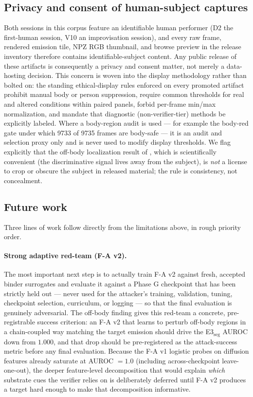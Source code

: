 \subsection{Privacy and consent of human-subject captures}\label{sec:discussion:privacy}

Both sessions in this corpus feature an identifiable human performer (D2 the first-human session, V10 an improvisation session), and every raw frame, rendered emission tile, NPZ RGB thumbnail, and browse preview in the release inventory therefore contains identifiable-subject content. Any public release of these artifacts is consequently a privacy and consent matter, not merely a data-hosting decision. This concern is woven into the display methodology rather than bolted on: the standing ethical-display rules enforced on every promoted artifact prohibit manual body or person suppression, require common thresholds for real and altered conditions within paired panels, forbid per-frame min/max normalization, and mandate that diagnostic (non-verifier-tier) methods be explicitly labeled. Where a body-region audit is used --- for example the body-red gate under which \num{9733} of \num{9735} frames are body-safe --- it is an audit and selection proxy only and is never used to modify display thresholds. We flag explicitly that the off-body localization result of , which is scientifically convenient (the discriminative signal lives away from the subject), is \emph{not} a license to crop or obscure the subject in released material; the rule is consistency, not concealment.

\subsection{Future work}\label{sec:discussion:future}

Three lines of work follow directly from the limitations above, in rough priority order.

\paragraph{Strong adaptive red-team (F-A v2).} The most important next step is to actually train F-A v2 against fresh, accepted binder surrogates and evaluate it against a Phase G checkpoint that has been strictly held out --- never used for the attacker's training, validation, tuning, checkpoint selection, curriculum, or logging --- so that the final evaluation is genuinely adversarial. The off-body finding gives this red-team a concrete, pre-registrable success criterion: an F-A v2 that learns to perturb off-body regions in a chain-coupled way matching the target emission should drive the E3$_{\mathrm{seg}}$ AUROC down from $1.000$, and that drop should be pre-registered as the attack-success metric before any final evaluation. Because the F-A v1 logistic probes on diffusion features already saturate at AUROC $=1.0$ (including across-checkpoint leave-one-out), the deeper feature-level decomposition that would explain \emph{which} substrate cues the verifier relies on is deliberately deferred until F-A v2 produces a target hard enough to make that decomposition informative.

